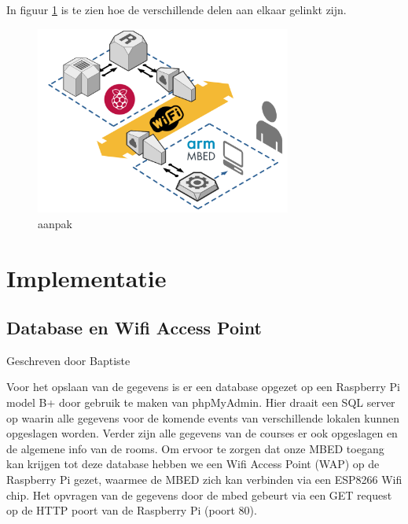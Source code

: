 \documentclass[a4paper,kul]{kulakarticle} %
\begin{document}
In figuur \ref{fig:aanpak} is te zien hoe de verschillende delen aan elkaar gelinkt zijn.

\begin{figure}[h]
	\centering
	\includegraphics[width=0.75\textwidth]{Solution_workflow}
	\caption{aanpak}
	\label{fig:aanpak}
\end{figure}

\newpage

\section{Implementatie}
\subsection{Database en Wifi Access Point} 
{\scriptsize Geschreven door Baptiste}
\newline

Voor het opslaan van de gegevens is er een database opgezet op een Raspberry Pi model B+ door gebruik te maken van phpMyAdmin. Hier draait een SQL server op waarin alle gegevens voor de komende events van verschillende lokalen kunnen opgeslagen worden. Verder zijn alle gegevens van de courses er ook opgeslagen en de algemene info van de rooms. Om ervoor te zorgen dat onze MBED toegang kan krijgen tot deze database hebben we een Wifi Access Point (WAP) op de Raspberry Pi gezet, waarmee de MBED zich kan verbinden via een ESP8266 Wifi chip. Het opvragen van de gegevens door de mbed gebeurt via een GET request op de HTTP poort van de Raspberry Pi (poort 80).
 
\end{document}
